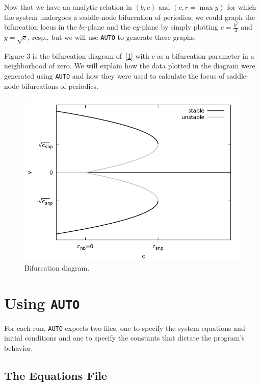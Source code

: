 \documentclass[a4paper,11pt]{article}
\begin{document}
\noindent
Now that we have an analytic relation in $(b,c)$ and $(c,r=\max y)$ for which the system undergoes a saddle-node bifurcation of periodics, we could graph the bifurcation locus in the $bc$-plane and the $cy$-plane by simply plotting $c=\frac{b^2}4$ and $y=\sqrt{c}$, resp., but we will use \texttt{AUTO} to generate these graphs.\vspace{3mm}

\noindent
Figure 3 is the bifurcation diagram of~\eqref{1} with $c$ as a bifurcation parameter in a neighborhood of zero. We will explain how the data plotted in the diagram were generated using \texttt{AUTO} and how they were used to calculate the locus of saddle-node bifurcations of periodics.\vspace{3mm}

\begin{center}
\begin{figure}[H]
  \centering
    \includegraphics[scale=.5]{gnuplot/fig3.png}
 \caption{Bifurcation diagram.}
\label{fig3}
\end{figure}
\end{center}

\section*{Using \texttt{AUTO}}

\noindent
For each run, \texttt{AUTO} expects two files, one to specify the system equations and initial conditions and one to specify the constants that dictate the program's behavior.

\subsection*{The Equations File}
\end{document}
